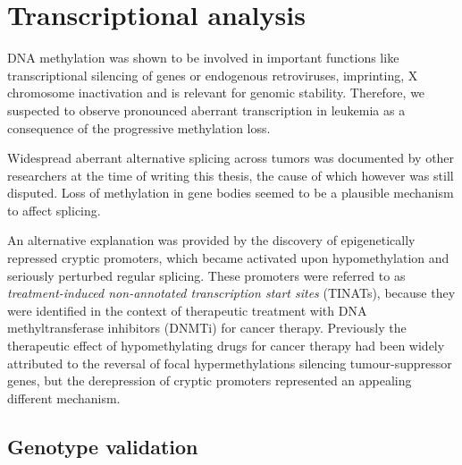 \chapter{Transcriptional analysis}
\label{chap:r:transcription}
\minitoc

DNA methylation was shown to be involved in important functions like transcriptional silencing of genes or endogenous retroviruses, imprinting, X chromosome inactivation and is relevant for genomic stability\cite{Goll2005,Schuebeler2015}. Therefore, we suspected to observe pronounced aberrant transcription in \dnmtchip \mllafnine leukemia as a consequence of the progressive methylation loss.

Widespread aberrant alternative splicing across tumors was documented by other researchers\cite{Kahles2018} at the time of writing this thesis, the cause of which however was still disputed. Loss of methylation in gene bodies seemed to be a plausible mechanism to affect splicing\cite{Mendizabal2017}.

An alternative explanation was provided by the discovery of epigenetically repressed cryptic promoters, which became activated upon hypomethylation and seriously perturbed regular splicing\cite{Brocks2017}. These promoters were referred to as \emph{treatment-induced non-annotated transcription start sites} (TINATs), because they were identified in the context of therapeutic treatment with DNA methyltransferase inhibitors (DNMTi) for cancer therapy. Previously the therapeutic effect of hypomethylating drugs for cancer therapy had been widely attributed to the reversal of focal hypermethylations silencing tumour-suppressor genes\cite{Cai2017}, but the derepression of cryptic promoters represented an appealing different mechanism. \clearpage



\fyfrank


\section{Genotype validation}
\label{chap:r:transcription:genotypeval}

